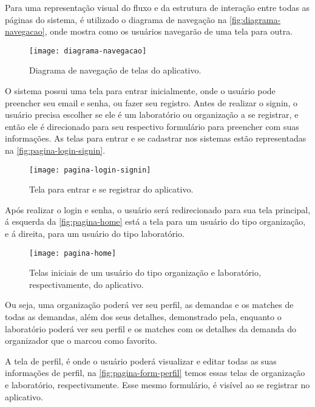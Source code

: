 Para uma representação visual do fluxo e da estrutura de interação entre todas as páginas do sistema, é utilizado o diagrama de navegação na \autoref{fig:diagrama-navegacao}, onde mostra como os usuários navegarão de uma tela para outra.

\begin{figure}[h!]
    \captionsetup{width=0.43\textwidth}
    \caption{Diagrama de navegação de telas do aplicativo.}
    \label{fig:diagrama-navegacao}
    \texttt{[image: diagrama-navegacao]}
    \fonte{}
\end{figure}

O sistema possui uma tela para entrar inicialmente, onde o usuário pode preencher seu email e senha, ou fazer seu registro. Antes de realizar o signin, o usuário precisa escolher se ele é um laboratório ou organização a se registrar, e então ele é direcionado para seu respectivo formulário para preencher com suas informações. As telas para entrar e se cadastrar nos sistemas estão representadas na \autoref{fig:pagina-login-signin}.

\begin{figure}[h!]
    \captionsetup{width=0.43\textwidth}
    \caption{Tela para entrar e se registrar do aplicativo.}
    \label{fig:pagina-login-signin}
    \texttt{[image: pagina-login-signin]}
    \fonte{}
\end{figure}

Após realizar o login e senha, o usuário será redirecionado para sua tela principal, á esquerda da \autoref{fig:pagina-home} está a tela para um usuário do tipo organização, e á direita, para um usuário do tipo laboratório.

\begin{figure}[h!]
    \captionsetup{width=0.43\textwidth}
    \caption{Telas iniciais de um usuário do tipo organização e laboratório, respectivamente, do aplicativo.}
    \label{fig:pagina-home}
    \texttt{[image: pagina-home]}
    \fonte{}
\end{figure}

Ou seja, uma organização poderá ver seu perfil, as demandas e os matches de todas as demandas, além dos seus detalhes, demonstrado pela, enquanto o laboratório poderá ver seu perfil e os matches com os detalhes da demanda do organizador que o marcou como favorito.

A tela de perfil, é onde o usuário poderá visualizar e editar todas as suas informações de perfil, na \autoref{fig:pagina-form-perfil} temos essas telas de organização e laboratório, respectivamente. Esse mesmo formulário, é visível ao se registrar no aplicativo.

